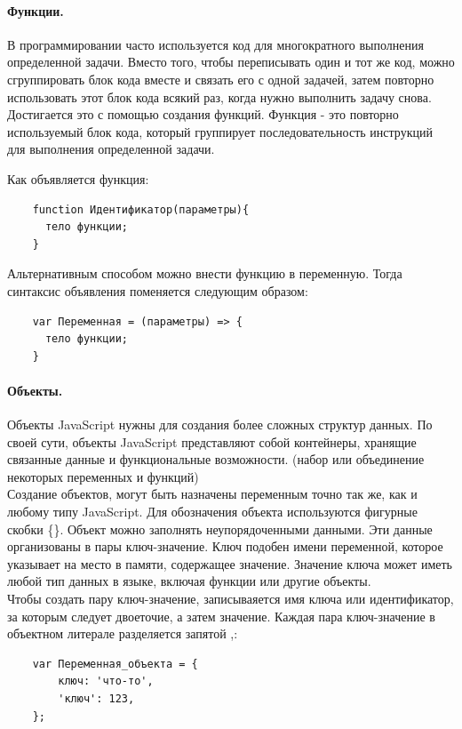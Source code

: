 \documentclass[14pt,Diplom]{diplomwork}
\begin{document}
\paragraph{Функции.}
 В программировании часто используется код для многократного выполнения определенной задачи. Вместо того, чтобы переписывать один и тот же код, можно сгруппировать блок кода вместе и связать его с одной задачей, затем повторно использовать этот блок кода всякий раз, когда нужно выполнить задачу снова. Достигается это с помощью создания функций. Функция - это повторно используемый блок кода, который группирует последовательность инструкций для выполнения определенной задачи.
 
 Как объявляется функция:
 \begin{verbatim} 
 	function Идентификатор(параметры){
 	  тело функции;
 	}
 \end{verbatim} 
 Альтернативным способом можно внести функцию в переменную. Тогда синтаксис объявления поменяется следующим образом:
 \begin{verbatim} 
 	var Переменная = (параметры) => {
 	  тело функции;
 	}
 \end{verbatim} 
  
\paragraph{Объекты.} 
Объекты JavaScript нужны для создания более сложных структур данных. По своей сути, объекты JavaScript представляют собой контейнеры, хранящие связанные данные и функциональные возможности. (набор или
объединение некоторых переменных и функций)\\

Создание объектов, могут быть назначены переменным точно так же, как и любому типу JavaScript. Для обозначения объекта используются фигурные скобки \{\}. Объект можно заполнять неупорядоченными данными. Эти данные организованы в пары ключ-значение. Ключ подобен имени переменной, которое указывает на место в памяти, содержащее значение. Значение ключа может иметь любой тип данных в языке, включая функции или другие объекты.\\

Чтобы создать пару ключ-значение, записываяется имя ключа или идентификатор, за которым следует двоеточие, а затем значение. Каждая пара ключ-значение в объектном литерале разделяется запятой ,:
\begin{verbatim} 
	var Переменная_объекта = {
		ключ: 'что-то',
		'ключ': 123,
	};
\end{verbatim} 
\end{document}
